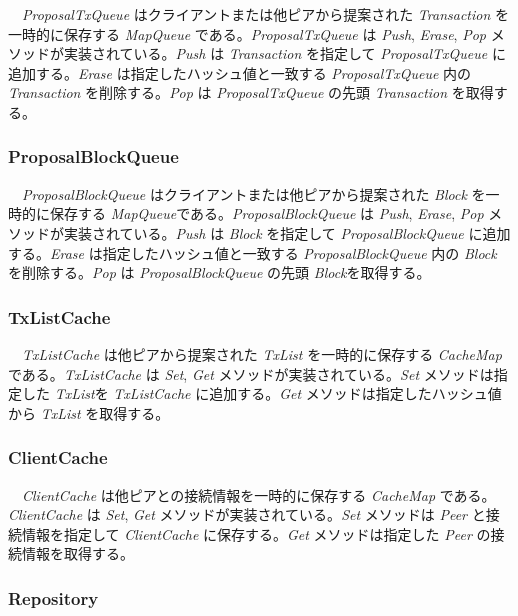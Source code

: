 　\emph{ProposalTxQueue} はクライアントまたは他ピアから提案された
\emph{Transaction} を一時的に保存する \emph{MapQueue}
である。\emph{ProposalTxQueue} は \emph{Push}, \emph{Erase}, \emph{Pop}
メソッドが実装されている。\emph{Push} は \emph{Transaction} を指定して
\emph{ProposalTxQueue} に追加する。\emph{Erase}
は指定したハッシュ値と一致する \emph{ProposalTxQueue} 内の
\emph{Transaction} を削除する。\emph{Pop} は \emph{ProposalTxQueue}
の先頭 \emph{Transaction} を取得する。

\hypertarget{proposalblockqueue}{%
\subsubsection{ProposalBlockQueue}\label{proposalblockqueue}}

　\emph{ProposalBlockQueue} はクライアントまたは他ピアから提案された
\emph{Block} を一時的に保存する
\emph{MapQueue}である。\emph{ProposalBlockQueue} は \emph{Push},
\emph{Erase}, \emph{Pop} メソッドが実装されている。\emph{Push} は
\emph{Block} を指定して \emph{ProposalBlockQueue}
に追加する。\emph{Erase} は指定したハッシュ値と一致する
\emph{ProposalBlockQueue} 内の \emph{Block} を削除する。\emph{Pop} は
\emph{ProposalBlockQueue} の先頭 \emph{Block}を取得する。

\hypertarget{txlistcache}{%
\subsubsection{TxListCache}\label{txlistcache}}

　\emph{TxListCache} は他ピアから提案された \emph{TxList}
を一時的に保存する \emph{CacheMap} である。\emph{TxListCache} は
\emph{Set}, \emph{Get} メソッドが実装されている。\emph{Set}
メソッドは指定した \emph{TxList}を \emph{TxListCache}
に追加する。\emph{Get} メソッドは指定したハッシュ値から \emph{TxList}
を取得する。

\hypertarget{clientcache}{%
\subsubsection{ClientCache}\label{clientcache}}

　\emph{ClientCache} は他ピアとの接続情報を一時的に保存する
\emph{CacheMap} である。 \emph{ClientCache} は \emph{Set}, \emph{Get}
メソッドが実装されている。\emph{Set} メソッドは \emph{Peer}
と接続情報を指定して \emph{ClientCache} に保存する。\emph{Get}
メソッドは指定した \emph{Peer} の接続情報を取得する。

\hypertarget{repository-1}{%
\subsubsection{Repository}\label{repository-1}}

